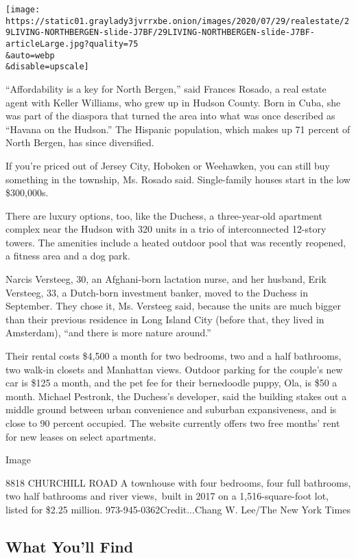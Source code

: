 \texttt{[image: https://static01.graylady3jvrrxbe.onion/images/2020/07/29/realestate/29LIVING-NORTHBERGEN-slide-J7BF/29LIVING-NORTHBERGEN-slide-J7BF-articleLarge.jpg?quality=75\\\&auto=webp\\\&disable=upscale]}

``Affordability is a key for North Bergen,'' said Frances Rosado, a real
estate agent with Keller Williams, who grew up in Hudson County. Born in
Cuba, she was part of the diaspora that turned the area into what was
once described as ``Havana on the Hudson.'' The Hispanic population,
which makes up 71 percent of North Bergen, has since diversified.

If you're priced out of Jersey City, Hoboken or Weehawken, you can still
buy something in the township, Ms. Rosado said. Single-family houses
start in the low \$300,000s.

There are luxury options, too, like the Duchess, a three-year-old
apartment complex near the Hudson with 320 units in a trio of
interconnected 12-story towers. The amenities include a heated outdoor
pool that was recently reopened, a fitness area and a dog park.

Narcis Versteeg, 30, an Afghani-born lactation nurse, and her husband,
Erik Versteeg, 33, a Dutch-born investment banker, moved to the Duchess
in September. They chose it, Ms. Versteeg said, because the units are
much bigger than their previous residence in Long Island City (before
that, they lived in Amsterdam), ``and there is more nature around.''

Their rental costs \$4,500 a month for two bedrooms, two and a half
bathrooms, two walk-in closets and Manhattan views. Outdoor parking for
the couple's new car is \$125 a month, and the pet fee for their
bernedoodle puppy, Ola, is \$50 a month. Michael Pestronk, the Duchess's
developer, said the building stakes out a middle ground between urban
convenience and suburban expansiveness, and is close to 90 percent
occupied. The website currently offers two free months' rent for new
leases on select apartments.

Image

8818 CHURCHILL ROAD \textbar{} A townhouse with four bedrooms, four full
bathrooms, two half bathrooms and river views,~built in 2017 on a
1,516-square-foot lot, listed for \$2.25 million.
973-945-0362Credit...Chang W. Lee/The New York Times

\hypertarget{what-youll-find}{%
\subsection{What You'll Find}\label{what-youll-find}}

